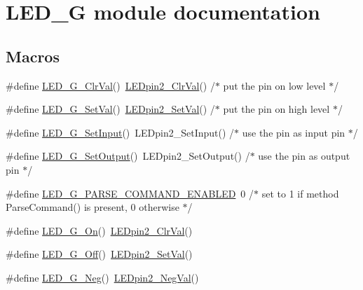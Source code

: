 \hypertarget{group___l_e_d___g__module}{}\section{L\+E\+D\+\_\+G module documentation}
\label{group___l_e_d___g__module}
\subsection*{Macros}
\begin{DoxyCompactItemize}
\item 
\#define \hyperlink{group___l_e_d___g__module_gaa2597e865b6615b8155dbda3d854e48a}{L\+E\+D\+\_\+\+G\+\_\+\+Clr\+Val}()~\hyperlink{group___l_e_dpin2__module_gaa47cab827e06b75f94eb46069f91515d}{L\+E\+Dpin2\+\_\+\+Clr\+Val}() /$\ast$ put the pin on low level $\ast$/
\item 
\#define \hyperlink{group___l_e_d___g__module_gaa55ebeac325a0d75872269ffab9a7e23}{L\+E\+D\+\_\+\+G\+\_\+\+Set\+Val}()~\hyperlink{group___l_e_dpin2__module_ga9937d1afa03ed5b4b392fc8ff4b0276a}{L\+E\+Dpin2\+\_\+\+Set\+Val}() /$\ast$ put the pin on high level $\ast$/
\item 
\#define \hyperlink{group___l_e_d___g__module_gaa12048317242db577e9ddcf82c250394}{L\+E\+D\+\_\+\+G\+\_\+\+Set\+Input}()~L\+E\+Dpin2\+\_\+\+Set\+Input() /$\ast$ use the pin as input pin $\ast$/
\item 
\#define \hyperlink{group___l_e_d___g__module_ga5068de2b652684b8d6853bf2877575b0}{L\+E\+D\+\_\+\+G\+\_\+\+Set\+Output}()~L\+E\+Dpin2\+\_\+\+Set\+Output() /$\ast$ use the pin as output pin $\ast$/
\item 
\#define \hyperlink{group___l_e_d___g__module_gaf884afaa3412629c6d271e21d9eaa1ae}{L\+E\+D\+\_\+\+G\+\_\+\+P\+A\+R\+S\+E\+\_\+\+C\+O\+M\+M\+A\+N\+D\+\_\+\+E\+N\+A\+B\+L\+ED}~0 /$\ast$ set to 1 if method Parse\+Command() is present, 0 otherwise $\ast$/
\item 
\#define \hyperlink{group___l_e_d___g__module_gaa2ba3dfac764cceec916eb2e938d1700}{L\+E\+D\+\_\+\+G\+\_\+\+On}()~\hyperlink{group___l_e_dpin2__module_gaa47cab827e06b75f94eb46069f91515d}{L\+E\+Dpin2\+\_\+\+Clr\+Val}()
\item 
\#define \hyperlink{group___l_e_d___g__module_ga1b82fa7a2e6460f0797f8cf1e3495af5}{L\+E\+D\+\_\+\+G\+\_\+\+Off}()~\hyperlink{group___l_e_dpin2__module_ga9937d1afa03ed5b4b392fc8ff4b0276a}{L\+E\+Dpin2\+\_\+\+Set\+Val}()
\item 
\#define \hyperlink{group___l_e_d___g__module_ga193d553cf44d91f5ccf241299a8f12b0}{L\+E\+D\+\_\+\+G\+\_\+\+Neg}()~\hyperlink{group___l_e_dpin2__module_ga785294b54fde11d21a6c5ed73ddbabdd}{L\+E\+Dpin2\+\_\+\+Neg\+Val}()

\end{DoxyCompactItemize}

